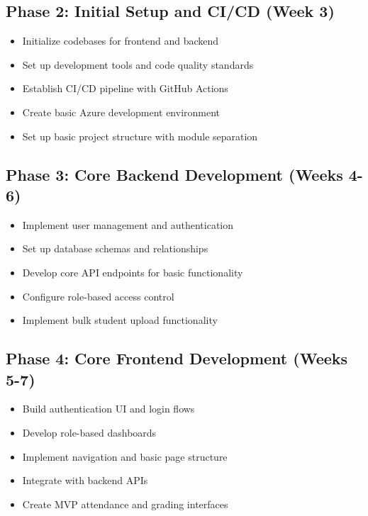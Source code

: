 \documentclass[11pt]{report}
\begin{document}
\subsection{Phase 2: Initial Setup and CI/CD (Week 3)}
\begin{itemize}
    \item Initialize codebases for frontend and backend
    \item Set up development tools and code quality standards
    \item Establish CI/CD pipeline with GitHub Actions
    \item Create basic Azure development environment
    \item Set up basic project structure with module separation
\end{itemize}

\subsection{Phase 3: Core Backend Development (Weeks 4-6)}
\begin{itemize}
    \item Implement user management and authentication
    \item Set up database schemas and relationships
    \item Develop core API endpoints for basic functionality
    \item Configure role-based access control
    \item Implement bulk student upload functionality
\end{itemize}

\subsection{Phase 4: Core Frontend Development (Weeks 5-7)}
\begin{itemize}
    \item Build authentication UI and login flows
    \item Develop role-based dashboards
    \item Implement navigation and basic page structure
    \item Integrate with backend APIs
    \item Create MVP attendance and grading interfaces
\end{itemize}
\end{document}
